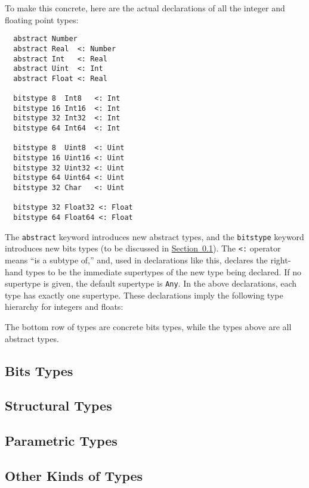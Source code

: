 \documentclass{article}
\renewcommand{\sec}[1]{\label{sec:#1}}
\newcommand{\Section}[1]{\hyperref[sec:#1]{Section~\ref*{sec:#1}}}
\begin{document}
To make this concrete, here are the actual declarations of all the integer and floating point types:
\begin{verbatim}
  abstract Number
  abstract Real  <: Number
  abstract Int   <: Real
  abstract Uint  <: Int
  abstract Float <: Real

  bitstype 8  Int8   <: Int
  bitstype 16 Int16  <: Int
  bitstype 32 Int32  <: Int
  bitstype 64 Int64  <: Int

  bitstype 8  Uint8  <: Uint
  bitstype 16 Uint16 <: Uint
  bitstype 32 Uint32 <: Uint
  bitstype 64 Uint64 <: Uint
  bitstype 32 Char   <: Uint

  bitstype 32 Float32 <: Float
  bitstype 64 Float64 <: Float
\end{verbatim}
The \verb|abstract| keyword introduces new abstract types, and the \verb|bitstype| keyword introduces new bits types (to be discussed in \Section{bits-types}).
The \verb|<:| operator means ``is a subtype of,'' and, used in declarations like this, declares the right-hand types to be the immediate supertypes of the new type being declared.
If no supertype is given, the default supertype is \verb|Any|.
In the above declarations, each type has exactly one supertype.
These declarations imply the following type hierarchy for integers and floats:
\begin{center}
\begin{tikzpicture}[>=latex,line join=bevel,font=\small\tt,scale=0.45]

\end{tikzpicture}
\end{center}
The bottom row of types are concrete bits types, while the types above are all abstract types.

\subsection{Bits Types}\sec{bits-types}

\subsection{Structural Types}\sec{structural-types}

\subsection{Parametric Types}\sec{parametric-types}

\subsection{Other Kinds of Types}\sec{other-kinds-of-types}
\end{document}
